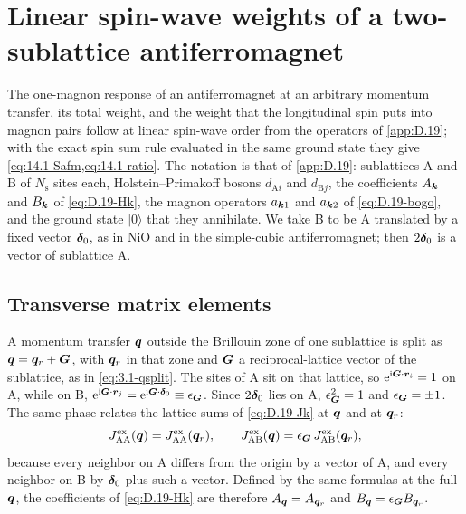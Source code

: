 \section[Spin weights of an antiferromagnet]{Linear spin-wave weights of a two-sublattice antiferromagnet}\label{app:D.38}

The one-magnon response of an antiferromagnet at an arbitrary momentum transfer, its total weight, and the weight that the longitudinal spin puts into magnon pairs follow at linear spin-wave order from the operators of \cref{app:D.19}; with the exact spin sum rule evaluated in the same ground state they give \cref{eq:14.1-Safm,eq:14.1-ratio}. The notation is that of \cref{app:D.19}: sublattices A and B of $N_{\mathrm{s}}$ sites each, Holstein--Primakoff bosons $d_{\mathrm{A}i}$ and $d_{\mathrm{B}j}$, the coefficients $A_{\bm{k}}$ and $B_{\bm{k}}$ of \cref{eq:D.19-Hk}, the magnon operators $a_{\bm{k}1}$ and $a_{\bm{k}2}$ of \cref{eq:D.19-bogo}, and the ground state $|0\rangle$ that they annihilate. We take B to be A translated by a fixed vector $\bm{\delta}_0$, as in NiO and in the simple-cubic antiferromagnet; then $2\bm{\delta}_0$ is a vector of sublattice A.

\subsection*{Transverse matrix elements}

A momentum transfer $\bm{q}$ outside the Brillouin zone of one sublattice is split as $\bm{q} = \bm{q}_r + \bm{G}$, with $\bm{q}_r$ in that zone and $\bm{G}$ a reciprocal-lattice vector of the sublattice, as in \cref{eq:3.1-qsplit}. The sites of A sit on that lattice, so $\mathrm{e}^{\mathrm{i}\bm{G}\cdot\bm{r}_i} = 1$ on A, while on B, $\mathrm{e}^{\mathrm{i}\bm{G}\cdot\bm{r}_j} = \mathrm{e}^{\mathrm{i}\bm{G}\cdot\bm{\delta}_0} \equiv \epsilon_{\bm{G}}$. Since $2\bm{\delta}_0$ lies on A, $\epsilon_{\bm{G}}^2 = 1$ and $\epsilon_{\bm{G}} = \pm1$. The same phase relates the lattice sums of \cref{eq:D.19-Jk} at $\bm{q}$ and at $\bm{q}_r$:
\begin{equation*}
  J^{\mathrm{ex}}_{\mathrm{AA}}(\bm{q}) = J^{\mathrm{ex}}_{\mathrm{AA}}(\bm{q}_r), \qquad J^{\mathrm{ex}}_{\mathrm{AB}}(\bm{q}) = \epsilon_{\bm{G}}\,J^{\mathrm{ex}}_{\mathrm{AB}}(\bm{q}_r) ,
\end{equation*}
because every neighbor on A differs from the origin by a vector of A, and every neighbor on B by $\bm{\delta}_0$ plus such a vector. Defined by the same formulas at the full $\bm{q}$, the coefficients of \cref{eq:D.19-Hk} are therefore $A_{\bm{q}} = A_{\bm{q}_r}$ and $B_{\bm{q}} = \epsilon_{\bm{G}}B_{\bm{q}_r}$.


